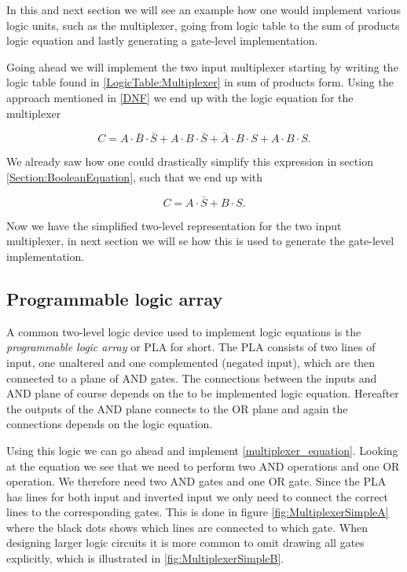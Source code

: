             In this and next section we will see an example how one would implement various logic units, such as the multiplexer, going from logic table to the sum of products logic equation and lastly generating a gate-level implementation.
            
            Going ahead we will implement the two input multiplexer starting by writing the logic table found in \ref{LogicTable:Multiplexer} in sum of products form. Using the approach mentioned in \ref{DNF} we end up with the logic equation for the multiplexer 
            
            \begin{equation}
                C = A \cdot \bar{B} \cdot \bar{S} + A \cdot B \cdot \bar{S} + \bar{A} \cdot B \cdot S
                    + A \cdot B \cdot S.
            \end{equation}
             
            We already saw how one could drastically simplify this expression in section \ref{Section:BooleanEquation}, such that we end up with
            
            \begin{equation}
                \label{multiplexer_equation}
                C = A\cdot \bar{S} + B\cdot S.
            \end{equation}
            
            Now we have the simplified two-level representation for the two input multiplexer, in next section we will se how this is used to generate the gate-level implementation.
        
        \subsection{Programmable logic array}
        
            A common two-level logic device used to implement logic equations is the \textit{programmable logic array} or PLA for short. The PLA consists of two lines of input, one unaltered and one complemented (negated input), which are then connected to a plane of AND gates. The connections between the inputs and AND plane of course depends on the to be implemented logic equation. Hereafter the outputs of the AND plane connects to the OR plane and again the connections depends on the logic equation.
            
            Using this logic we can go ahead and implement \ref{multiplexer_equation}. Looking at the equation we see that we need to perform two AND operations and one OR operation. We therefore need two AND gates and one OR gate. Since the PLA has lines for both input and inverted input we only need to connect the correct lines to the corresponding gates. This is done in figure \ref{fig:MultiplexerSimpleA} where the black dots shows which lines are connected to which gate. When designing larger logic circuits it is more common to omit drawing all gates explicitly, which is illustrated in \ref{fig:MultiplexerSimpleB}. 
        
